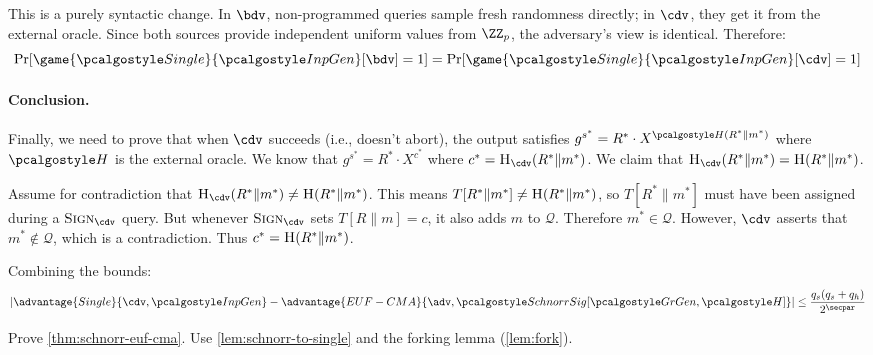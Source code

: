 \begin{mysolution}
  This is a purely syntactic change. In $\bdv$, non-programmed queries sample fresh randomness directly; in $\cdv$, they get it from the external oracle.
  Since both sources provide independent uniform values from $\ZZ_p$, the adversary's view is identical. Therefore:
  \[
    \Pr[\game{\algo{Single}}{\algo{InpGen}}[\bdv] = 1] = \Pr[\game{\algo{Single}}{\algo{InpGen}}[\cdv] = 1]
  \]

  \paragraph{Conclusion.}
  Finally, we need to prove that when $\cdv$ succeeds (i.e., doesn't abort), the output satisfies $g^{s^*} = R^* \cdot X^{\algo{H}(R^* \| m^*)}$ where $\algo{H}$ is the external oracle. We know that $g^{s^*} = R^* \cdot X^{c^*}$ where $c^* = \pcoracle{H}_{\cdv}(R^* \| m^*)$. We claim that $\pcoracle{H}_{\cdv}(R^* \| m^*) = \pcoracle{H}(R^* \| m^*)$.
  
  Assume for contradiction that $\pcoracle{H}_{\cdv}(R^* \| m^*) \neq \pcoracle{H}(R^* \| m^*)$. This means $T[R^* \| m^*] \neq {\normalfont\textsc{H}}(R^* \| m^*)$, so $T[R^* \| m^*]$ must have been assigned during a $\pcoracle{Sign}_{\cdv}$ query. But whenever $\pcoracle{Sign}_{\cdv}$ sets $T[R \| m] = c$, it also adds $m$ to $\mathcal{Q}$. Therefore $m^* \in \mathcal{Q}$. However, $\cdv$ asserts that $m^* \notin \mathcal{Q}$, which is a contradiction. Thus $c^* = {\normalfont\textsc{H}}(R^* \| m^*)$.
  
  Combining the bounds:
  \[
    \left|\advantage{Single}{\cdv, \algo{InpGen}} - \advantage{EUF-CMA}{\adv, \algo{SchnorrSig}[\grgen, \algo{H}]}\right| \leq \frac{q_s(q_s + q_h)}{2^\secpar}
  \]

\end{mysolution}
\fi

\begin{exercise}\label{ex:schnorr-euf-cma}
  Prove \autoref{thm:schnorr-euf-cma}. Use \autoref{lem:schnorr-to-single} and the forking lemma (\autoref{lem:fork}).
\end{exercise}

